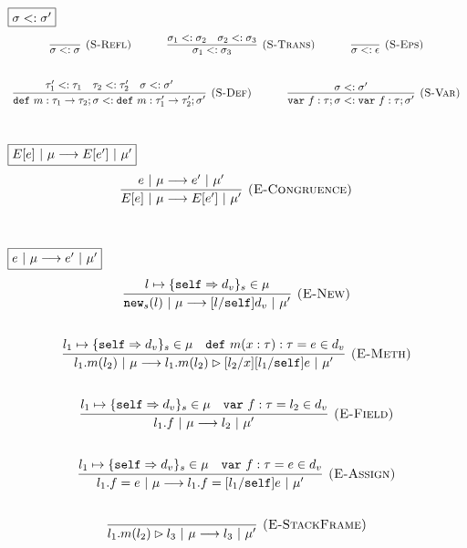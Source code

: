 \documentclass{llncs}
\newcommand{\keywadj}[1]{\mathtt{#1}}
\newcommand{\keyw}[1]{\keywadj{#1}~}
\begin{document}
$\fbox{$\sigma <: \sigma'$}$
\[
\begin{array}{c}
\infer[\textsc{(S-Refl)}]
  {\sigma <: \sigma}
  {}%
~~~~~~~~~~
\infer[\textsc{(S-Trans)}]
  {\sigma_1 <: \sigma_3}
  {\sigma_1 <: \sigma_2 & \sigma_2 <: \sigma_3}%
~~~~~~~~~~
\infer[\textsc{(S-Eps)}]
  {\sigma <: \epsilon}
  {}\\[5ex]

\infer[\textsc{(S-Def)}]
  {\keyw{def} m:\tau_1 \rightarrow \tau_2; \sigma <: \keyw{def} m:\tau_1' \rightarrow \tau_2'; \sigma'}
  {\tau_1' <: \tau_1 & \tau_2 <: \tau_2' & \sigma <: \sigma'}%
~~~~~~~~~~
\infer[\textsc{(S-Var)}]
  {\keyw{var} f:\tau; \sigma <: \keyw{var} f:\tau; \sigma'}
  {\sigma <: \sigma'}\\[5ex]  

\end{array}
\]

$\fbox{$E[e]~|~\mu \longrightarrow E[e']~|~\mu'$}$
\[
\begin{array}{c}
\infer[\textsc{(E-Congruence)}]
  {E[e]~|~\mu \longrightarrow E[e']~|~\mu'}
  {e~|~\mu \longrightarrow e'~|~\mu'}\\[5ex]  
\end{array}
\]


$\fbox{$e~|~\mu \longrightarrow e'~|~\mu'$}$
\[
\begin{array}{c}
\infer[\textsc{(E-New)}]
  {\keywadj{new}_{s}(l)~|~\mu \longrightarrow [l/\keywadj{self}]d_v~|~\mu'}
  {l \mapsto \{ \keywadj{self} \Rightarrow d_v \}_{s} \in \mu}\\[5ex]
  
\infer[\textsc{(E-Meth)}]
  {l_1.m(l_2)~|~\mu \longrightarrow l_1.m(l_2) \rhd [l_2/x][l_1/\keywadj{self}]e~|~\mu'}
  {l_1 \mapsto \{ \keywadj{self} \Rightarrow d_v \}_{s} \in \mu & \keyw{def} m(x : \tau) : \tau = e \in d_v}\\[5ex]

\infer[\textsc{(E-Field)}]
  {l_1.f~|~\mu \longrightarrow l_2~|~\mu'}
  {l_1 \mapsto \{ \keywadj{self} \Rightarrow d_v \}_{s} \in \mu & \keyw{var} f:\tau = l_2 \in d_v}\\[5ex]

\infer[\textsc{(E-Assign)}]
  {l_1.f = e~|~\mu \longrightarrow l_1.f = [l_1/\keywadj{self}]e~|~\mu'}
  {l_1 \mapsto \{ \keywadj{self} \Rightarrow d_v \}_{s} \in \mu & \keyw{var} f:\tau = e \in d_v}\\[5ex]

\infer[\textsc{(E-StackFrame)}]
  {l_1.m(l_2) \rhd l_3~|~\mu \longrightarrow l_3~|~\mu'}
  {}\\[5ex]
  
\end{array}
\]
\end{document}
